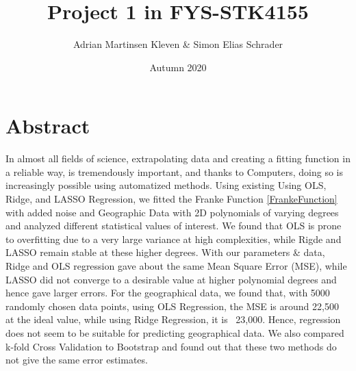 \documentclass[11pt,a4paper,titlepage]{article}
\title{Project 1 in FYS-STK4155}
\author{Adrian Martinsen Kleven & Simon Elias Schrader }
\date{Autumn 2020}
\begin{document}
\tableofcontents
\listoffigures
\listoftables

\clearpage
\section{Abstract}
In almost all fields of science, extrapolating data and creating a fitting function in a reliable way, is tremendously important, and thanks to Computers, doing so is increasingly possible using automatized methods. Using existing Using OLS, Ridge, and LASSO Regression, we fitted the Franke Function \eqref{FrankeFunction} with added noise and Geographic Data with 2D polynomials of varying degrees and analyzed different statistical values of interest. We found that OLS is prone to overfitting due to a very large variance at high complexities, while Rigde and LASSO remain stable at these higher degrees. With our parameters \& data, Ridge and OLS regression gave about the same Mean Square Error (MSE), while LASSO did not converge to a desirable value at higher polynomial degrees and hence gave larger errors. For the geographical data, we found that, with 5000 randomly chosen data points, using  OLS Regression, the MSE is around 22,500 at the ideal value, while using Ridge Regression, it is ~23,000. Hence, regression does not seem to be suitable for predicting geographical data. We also compared k-fold Cross Validation to Bootstrap and found out that these two methods do not give the same error estimates.

\end{document}
